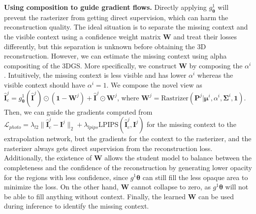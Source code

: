 \documentclass{article} %
\begin{document}
\textbf{Using composition to guide gradient flows.}
Directly applying $g^{1}_{\bm \theta}$ will prevent the rasterizer from getting direct supervision, which can harm the reconstruction quality. The ideal situation is to separate the missing context and the visible context using a confidence weight matrix $\bm W$ and treat their losses differently, but this separation is unknown before obtaining the 3D reconstruction. However, we can estimate the missing context using alpha compositing of the 3DGS. More specifically, we construct $\bm W$ by composing the $\alpha^i$. Intuitively, the missing context is less visible and has lower $\alpha^i$ whereas the visible context should have $\alpha^i=1$. We compose the novel view as $\hat{\bm{I}}^j_c=g^{1}_{\bm \theta}(\hat{\bm{I}}^j) \odot (\bm 1 - \bm W^j) + \hat{\bm{I}}^j \odot \bm W^j$, where $\bm W^j=\mathrm{Rastrizer}(\mathbf{P}^j|\bm{\mu}^i, \alpha^i, \bm{\Sigma}^i, \bm{1})$. Then, we can guide the gradients computed from $\mathcal{L}_{photo}=\lambda_{l2}\|\hat{\bm{I}}^j_c-\bm I^j\|_2+\lambda_{lpips}\mathrm{LPIPS}(\hat{\bm{I}}^j_c,\bm I^j)$ for the missing context to the extrapolation network, but the gradients for the context to the rasterizer, and the rasterizer always gets direct supervision from the reconstruction loss.  Additionally, the existence of $\bm W$ allows the student model to balance between the completeness and the confidence of the reconstruction by generating lower opacity for the regions with less confidence, since $g^{1}{\bm \theta}$ can still fill the less opaque area to minimize the loss. On the other hand, $\bm W$ cannot collapse to zero, as $g^{1}{\bm \theta}$ will not be able to fill anything without context. Finally, the learned $\bm W$ can be used during inference to identify the missing context.
\end{document}
